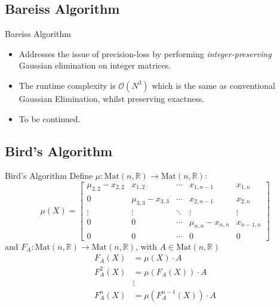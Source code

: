 \documentclass{beamer}
\begin{document}
\subsection{Bareiss Algorithm}

\begin{frame}{Bareiss Algorithm}

    \begin{itemize}

        \item Addresses the issue of precision-loss by performing \emph{integer-preserving}
            Gaussian elimination on integer matrices.

        \item The runtime complexity is $\mathcal{O}(N^3)$ which is the same as conventional
            Gaussian Elimination, whilst preserving exactness.

        \item To be continued.

    \end{itemize}

\end{frame}

\subsection{Bird's Algorithm}

\begin{frame}{Bird's Algorithm}
    Define $\mu : \mathrm{Mat}(n, \mathbb{R}) \to \mathrm{Mat}(n, \mathbb{R})$:
    \[
        \mu(X) =
        \begin{bmatrix}{}
            \mu_{2,2} - x_{2,2} & x_{1,2}             & \cdots & x_{1,n-1}           & x_{1,n} \\
            0                   & \mu_{3,3} - x_{3,3} & \cdots & x_{2,n-1}           & x_{2,n} \\
            \vdots              & \vdots              & \ddots & \vdots              & \vdots \\
            0                   & 0                   & \cdots & \mu_{n,n} - x_{n,n} & x_{n-1,n} \\
            0                   & 0                   & \cdots & 0                   & 0
        \end{bmatrix}
    \]
    and $F_A : \mathrm{Mat}(n, \mathbb{R}) \to \mathrm{Mat}(n, \mathbb{R})$, with $A \in \mathrm{Mat}(n, \mathbb{R})$
    \begin{align*}{}
        F_A(X)    & = \mu(X)\cdot A \\
        F_A^2(X)  & = \mu(F_A(X)) \cdot A \\
                  & \vdots \\
        F_A^n(X)  & = \mu(F_A^{n-1}(X)) \cdot A \\
    \end{align*}

\end{frame}
\end{document}
